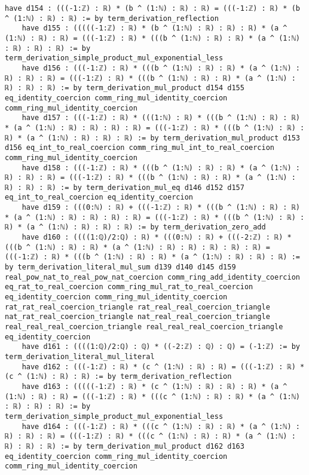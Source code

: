 \documentclass{article}
\begin{document}
\begin{tcolorbox}[colback=white!10, width=\linewidth]
\begin{lstlisting}[language=Lean4]
    have d154 : (((-1:ℤ) : ℝ) * (b ^ (1:ℕ) : ℝ) : ℝ) = (((-1:ℤ) : ℝ) * (b ^ (1:ℕ) : ℝ) : ℝ) := by term_derivation_reflection
    have d155 : (((((-1:ℤ) : ℝ) * (b ^ (1:ℕ) : ℝ) : ℝ) : ℝ) * (a ^ (1:ℕ) : ℝ) : ℝ) = (((-1:ℤ) : ℝ) * (((b ^ (1:ℕ) : ℝ) : ℝ) * (a ^ (1:ℕ) : ℝ) : ℝ) : ℝ) := by term_derivation_simple_product_mul_exponential_less
    have d156 : (((-1:ℤ) : ℝ) * (((b ^ (1:ℕ) : ℝ) : ℝ) * (a ^ (1:ℕ) : ℝ) : ℝ) : ℝ) = (((-1:ℤ) : ℝ) * (((b ^ (1:ℕ) : ℝ) : ℝ) * (a ^ (1:ℕ) : ℝ) : ℝ) : ℝ) := by term_derivation_mul_product d154 d155 eq_identity_coercion comm_ring_mul_identity_coercion comm_ring_mul_identity_coercion
    have d157 : (((-1:ℤ) : ℝ) * (((1:ℕ) : ℝ) * (((b ^ (1:ℕ) : ℝ) : ℝ) * (a ^ (1:ℕ) : ℝ) : ℝ) : ℝ) : ℝ) = (((-1:ℤ) : ℝ) * (((b ^ (1:ℕ) : ℝ) : ℝ) * (a ^ (1:ℕ) : ℝ) : ℝ) : ℝ) := by term_derivation_mul_product d153 d156 eq_int_to_real_coercion comm_ring_mul_int_to_real_coercion comm_ring_mul_identity_coercion
    have d158 : (((-1:ℤ) : ℝ) * (((b ^ (1:ℕ) : ℝ) : ℝ) * (a ^ (1:ℕ) : ℝ) : ℝ) : ℝ) = (((-1:ℤ) : ℝ) * (((b ^ (1:ℕ) : ℝ) : ℝ) * (a ^ (1:ℕ) : ℝ) : ℝ) : ℝ) := by term_derivation_mul_eq d146 d152 d157 eq_int_to_real_coercion eq_identity_coercion
    have d159 : (((0:ℕ) : ℝ) + (((-1:ℤ) : ℝ) * (((b ^ (1:ℕ) : ℝ) : ℝ) * (a ^ (1:ℕ) : ℝ) : ℝ) : ℝ) : ℝ) = (((-1:ℤ) : ℝ) * (((b ^ (1:ℕ) : ℝ) : ℝ) * (a ^ (1:ℕ) : ℝ) : ℝ) : ℝ) := by term_derivation_zero_add
    have d160 : ((((1:ℚ)/2:ℚ) : ℝ) * (((0:ℕ) : ℝ) + (((-2:ℤ) : ℝ) * (((b ^ (1:ℕ) : ℝ) : ℝ) * (a ^ (1:ℕ) : ℝ) : ℝ) : ℝ) : ℝ) : ℝ) = (((-1:ℤ) : ℝ) * (((b ^ (1:ℕ) : ℝ) : ℝ) * (a ^ (1:ℕ) : ℝ) : ℝ) : ℝ) := by term_derivation_literal_mul_sum d139 d140 d145 d159 real_pow_nat_to_real_pow_nat_coercion comm_ring_add_identity_coercion eq_rat_to_real_coercion comm_ring_mul_rat_to_real_coercion eq_identity_coercion comm_ring_mul_identity_coercion rat_rat_real_coercion_triangle rat_real_real_coercion_triangle nat_rat_real_coercion_triangle nat_real_real_coercion_triangle real_real_real_coercion_triangle real_real_real_coercion_triangle eq_identity_coercion
    have d161 : ((((1:ℚ)/2:ℚ) : ℚ) * ((-2:ℤ) : ℚ) : ℚ) = (-1:ℤ) := by term_derivation_literal_mul_literal
    have d162 : (((-1:ℤ) : ℝ) * (c ^ (1:ℕ) : ℝ) : ℝ) = (((-1:ℤ) : ℝ) * (c ^ (1:ℕ) : ℝ) : ℝ) := by term_derivation_reflection
    have d163 : (((((-1:ℤ) : ℝ) * (c ^ (1:ℕ) : ℝ) : ℝ) : ℝ) * (a ^ (1:ℕ) : ℝ) : ℝ) = (((-1:ℤ) : ℝ) * (((c ^ (1:ℕ) : ℝ) : ℝ) * (a ^ (1:ℕ) : ℝ) : ℝ) : ℝ) := by term_derivation_simple_product_mul_exponential_less
    have d164 : (((-1:ℤ) : ℝ) * (((c ^ (1:ℕ) : ℝ) : ℝ) * (a ^ (1:ℕ) : ℝ) : ℝ) : ℝ) = (((-1:ℤ) : ℝ) * (((c ^ (1:ℕ) : ℝ) : ℝ) * (a ^ (1:ℕ) : ℝ) : ℝ) : ℝ) := by term_derivation_mul_product d162 d163 eq_identity_coercion comm_ring_mul_identity_coercion comm_ring_mul_identity_coercion

\end{lstlisting}
\end{tcolorbox}
\end{document}
